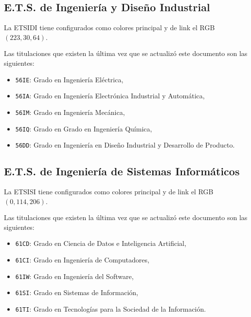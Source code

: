 \documentclass[%
    school=etsisi,%
    type=pfg,%
    degree=61CD,%
]{upm-report}
\begin{document}
\subsection{E.T.S. de Ingeniería y Diseño Industrial}

La ETSIDI tiene configurados como colores principal y de link el RGB $(223,30,64)$.

Las titulaciones que existen la última vez que se actualizó este documento son las siguientes:

\begin{itemize}
    \item \texttt{56IE}: Grado en Ingeniería Eléctrica,
    \item \texttt{56IA}: Grado en Ingeniería Electrónica Industrial y Automática,
    \item \texttt{56IM}: Grado en Ingeniería Mecánica,
    \item \texttt{56IQ}: Grado en Grado en Ingeniería Química,
    \item \texttt{56DD}: Grado en Ingeniería en Diseño Industrial y Desarrollo de Producto.
\end{itemize}

\subsection{E.T.S. de Ingeniería de Sistemas Informáticos}

La ETSISI tiene configurados como colores principal y de link el RGB $(0,114,206)$.

Las titulaciones que existen la última vez que se actualizó este documento son las siguientes:

\begin{itemize}
    \item \texttt{61CD}: Grado en Ciencia de Datos e Inteligencia Artificial,
    \item \texttt{61CI}: Grado en Ingeniería de Computadores,
    \item \texttt{61IW}: Grado en Ingeniería del Software,
    \item \texttt{61SI}: Grado en Sistemas de Información,
    \item \texttt{61TI}: Grado en Tecnologías para la Sociedad de la Información.
\end{itemize}
\end{document}
